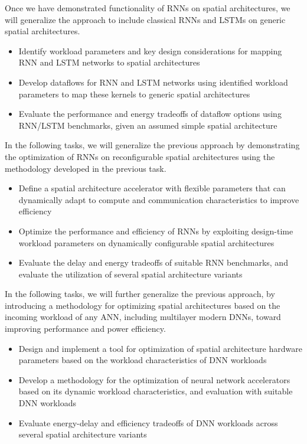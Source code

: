 Once we have demonstrated functionality of RNNs on spatial architectures, we will generalize the approach to include classical RNNs and LSTMs on generic spatial architectures. 

\begin{itemize}
    \item Identify workload parameters and key design considerations for mapping RNN and LSTM networks to spatial architectures
    \item Develop dataflows for RNN and LSTM networks using identified workload parameters to map these kernels to generic spatial architectures
    \item Evaluate the performance and energy tradeoffs of dataflow options using RNN/LSTM benchmarks, given an assumed simple spatial architecture
\end{itemize}

In the following tasks, we will generalize the previous approach by demonstrating the optimization of RNNs on reconfigurable spatial architectures using the methodology developed in the previous task.

\begin{itemize}
    \item Define a spatial architecture accelerator with flexible parameters that can dynamically adapt to compute and communication characteristics to improve efficiency
    \item Optimize the performance and efficiency of RNNs by exploiting design-time workload parameters on dynamically configurable spatial architectures
    \item Evaluate the delay and energy tradeoffs of suitable RNN benchmarks, and evaluate the utilization of several spatial architecture variants
\end{itemize}

In the following tasks, we will further generalize the previous approach, by introducing a methodology for optimizing spatial architectures based on the incoming workload of any ANN, including multilayer modern DNNs, toward improving performance and power efficiency.

\begin{itemize}
    \item Design and implement a tool for optimization of spatial architecture hardware parameters based on the workload characteristics of DNN workloads
    \item Develop a methodology for the optimization of neural network accelerators based on its dynamic workload characteristics, and evaluation with suitable DNN workloads
    \item Evaluate energy-delay and efficiency tradeoffs of DNN workloads across several spatial architecture variants
\end{itemize}

